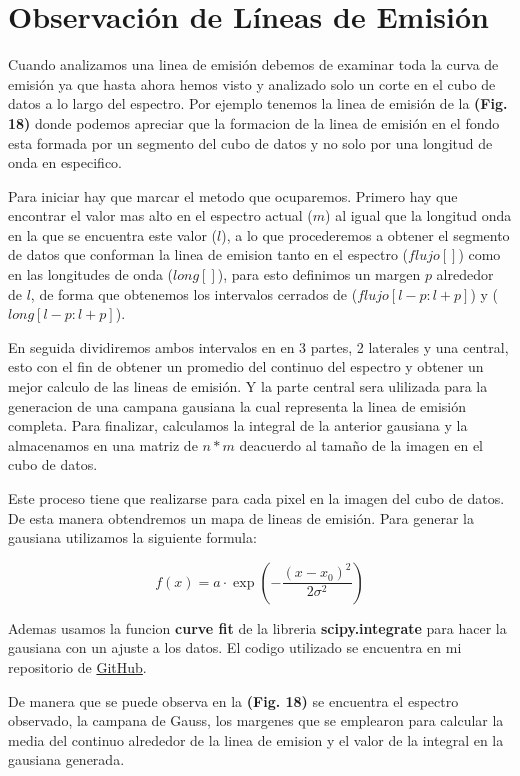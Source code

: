 \documentclass[9pt,twocolumn,a4paper]{opticajnl}
\begin{document}
\section*{Observación de Líneas de Emisión}
Cuando analizamos una linea de emisión debemos de examinar toda la curva de emisión ya que hasta ahora hemos visto y analizado solo un corte en el cubo de datos a lo largo del espectro. Por ejemplo tenemos la linea de emisión de la \textbf{(Fig. 18)} donde podemos apreciar que la formacion de la linea de emisión en el fondo esta formada por un segmento del cubo de datos y no solo por una longitud de onda en especifico.

Para iniciar hay que marcar el metodo que ocuparemos. Primero hay que encontrar el valor mas alto en el espectro actual ($m$)  al igual que la longitud onda en la que se encuentra este valor ($l$), a lo que procederemos a obtener el segmento de datos que conforman la linea de emision tanto en el espectro ($flujo[]$) como en las longitudes de onda ($long[]$), para esto definimos un margen $p$ alrededor de $l$, de forma que obtenemos los intervalos cerrados de ($flujo[l-p:l+p]$) y ($long[l-p:l+p]$). 

En seguida dividiremos ambos intervalos en en 3 partes, 2 laterales y una central, esto con el fin de obtener un promedio del continuo del espectro y obtener un mejor calculo de las lineas de emisión. Y la parte central sera ulilizada para la generacion de una campana gausiana la cual representa la linea de emisión completa. Para finalizar, calculamos la integral de la anterior gausiana y la almacenamos en una matriz de $n*m$ deacuerdo al tamaño de la imagen en el cubo de datos. 

Este proceso tiene que realizarse para cada pixel en la imagen del cubo de datos. De esta manera obtendremos un mapa de lineas de emisión.
Para generar la gausiana utilizamos la siguiente formula:

$$
f(x) = a \cdot \exp\left( -\frac{(x - x_0)^2}{2\sigma^2} \right)
$$

Ademas usamos la funcion \textbf{curve fit} de la libreria \textbf{scipy.integrate} para hacer la gausiana con un ajuste a los datos.
El codigo utilizado se encuentra en mi repositorio de \href{https://github.com/renatosanz/delfin}{GitHub}. 

De manera que se puede observa en la \textbf{(Fig. 18)} se encuentra el espectro observado, la campana de Gauss, los margenes que se emplearon para calcular la media del continuo alrededor de la linea de emision y el valor de la integral en la gausiana generada.
\end{document}
